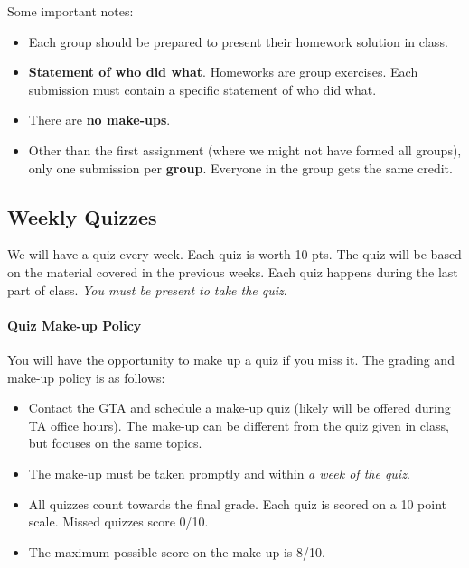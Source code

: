 \documentclass[11pt]{article}
\begin{document}
Some important notes:

\begin{itemize}
\item
Each group should be prepared to present their homework solution in
class.

\item
  \textbf{Statement of who did what}. Homeworks are group exercises.
  Each submission must contain a specific statement of who did what.
\item
  There are \textbf{no make-ups}.
\item
  Other than the first assignment (where we might not have formed all
  groups), only one submission per \textbf{\textbf{group}}. Everyone in
  the group gets the same credit.
\end{itemize}

\subsection{Weekly Quizzes}\label{weekly-quizzes}

We will have a quiz every week. Each quiz is worth 10 pts. The quiz will be based on the material covered in the previous weeks. Each quiz happens during the last part of class. \emph{You must be present to take the quiz}.


\paragraph{Quiz Make-up Policy} You will have the opportunity to make up a quiz if you miss it. The grading and make-up policy is as follows:

\begin{itemize}
\item Contact the GTA and schedule a make-up quiz (likely will be offered during TA office hours). The make-up can be different from the quiz given in class, but focuses on the same topics.
\item
  The make-up must be taken promptly and within \emph{a week of the quiz}.
\item
  All quizzes count towards the final grade. Each quiz is scored on a 10
  point scale. Missed quizzes score 0/10.
\item
  The maximum possible score on the make-up is 8/10. 

\end{itemize}
\end{document}
